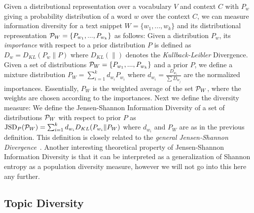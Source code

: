 \documentclass{article}
\begin{document}
Given a distributional representation over a vocabulary $V$ and context $C$ with $P_w$ giving a probability distribution of a
word $w$ over the context $C$, we can measure information diversity for a text snippet $W=\{w_1,...,w_k\}$ and its
distributional representation ${\mathcal P}_{W}=\{P_{w_1},...,P_{w_k}\}$ as follows:
\bed\label{importance}
Given a distribution $P_w$, its {\sl importance} with respect to a
prior distribution $P$ is defined as $D_w = D_{KL}(P_w\|P)$ where $D_{KL}(\|)$ denotes the
{\sl Kullback-Leibler} Divergence.
\eed
\bed\label{mixture}
Given a set of distributions ${\mathcal P}_{W}=\{P_{w_1},...,P_{w_k}\}$ and a
prior $P$, we
define a mixture distribution $P_W=\sum_{i=1}^k d_{w_i} P_{w_i}$ where $d_{w_i}=\frac{D_{w_i}}{\sum D_{w_j}}$ are the normalized
importances.
\eed
Essentially, $P_W$ is the weighted average of the set ${\mathcal P}_{W}$, where
the weights are chosen according to the importances. Next we
define the diversity measure:
\bed\label{diversity}
We define the Jensen-Shannon Information Diversity of a set of
distributions ${\mathcal P}_W$ with respect to 
prior $P$ as $\mbox{JSD}_P({\mathcal P}_W)=\sum_{i=1}^k d_{w_i}D_{KL}(P_{w_i}\|P_W)$
where $d_{w_i}$ and $P_W$ are as in the previous definition.
\eed
This definition is closely related to the 
{\em general Jensen-Shannon Divergence}~\cite{FugledeTopsoe}. Another
interesting theoretical property of Jensen-Shannon Information
Diversity is that it can be interpreted as a generalization of Shannon
entropy as a population diversity measure, however we will not go
into this here any further. 


\subsection{Topic Diversity}
\label{sec:topic-diversity}
\end{document}
